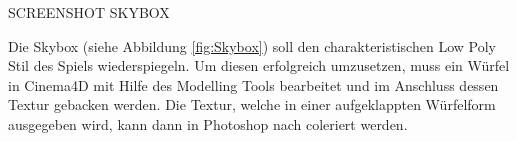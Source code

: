 

SCREENSHOT SKYBOX

Die Skybox (siehe Abbildung \ref{fig:Skybox}) soll den charakteristischen Low Poly Stil des Spiels wiederspiegeln. Um diesen erfolgreich umzusetzen, muss ein Würfel in Cinema4D mit Hilfe des Modelling Tools bearbeitet und im Anschluss dessen Textur gebacken werden. Die Textur, welche in einer aufgeklappten Würfelform ausgegeben wird, kann dann in Photoshop nach coleriert werden.